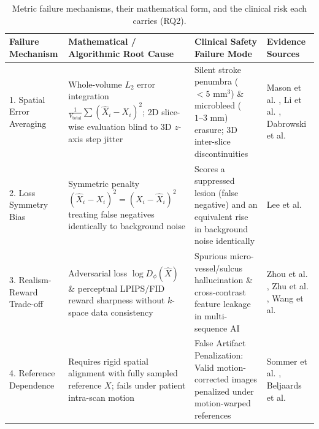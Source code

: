 \documentclass[11pt]{article}
\begin{document}
\begin{table}[t]
\centering
\caption{Metric failure mechanisms, their mathematical form, and the clinical risk each carries (RQ2).}
\label{tab:rq2_failure_modes}
\small
\setlength{\tabcolsep}{3pt}
\renewcommand{\arraystretch}{1.18}
\begin{tabular}{p{} p{} p{} p{}}
\hline
\textbf{Failure Mechanism} & \textbf{Mathematical / Algorithmic Root Cause} & \textbf{Clinical Safety Failure Mode} & \textbf{Evidence Sources} \\
\hline
1. Spatial Error Averaging & Whole-volume $L_2$ error integration $\frac{1}{V_{\text{total}}} \sum (\hat{X}_i - X_i)^2$; 2D slice-wise evaluation blind to 3D $z$-axis step jitter & Silent stroke penumbra ($<5\text{ mm}^3$) \& microbleed ($1\text{--}3\text{ mm}$) erasure; 3D inter-slice discontinuities & Mason et al. \cite{mason2020comparison}, Li et al. \cite{li2015artifactual}, Dabrowski et al. \cite{dabrowski2025sismik} \\
\hline
2. Loss Symmetry Bias & Symmetric penalty $(\hat{X}_i - X_i)^2 = (X_i - \hat{X}_i)^2$ treating false negatives identically to background noise & Scores a suppressed lesion (false negative) and an equivalent rise in background noise identically & Lee et al. \cite{junhyeok2026lesionaware} \\
\hline
3. Realism-Reward Trade-off & Adversarial loss $\log D_\phi(\hat{X})$ \& perceptual LPIPS/FID reward sharpness without $k$-space data consistency & Spurious micro-vessel/sulcus hallucination \& cross-contrast feature leakage in multi-sequence AI & Zhou et al. \cite{zhou2024adversarial}, Zhu et al. \cite{zhu2025cycleconditional}, Wang et al. \cite{wang2025variableflipangle} \\
\hline
4. Reference Dependence & Requires rigid spatial alignment with fully sampled reference $X$; fails under patient intra-scan motion & False Artifact Penalization: Valid motion-corrected images penalized under motion-warped references & Sommer et al. \cite{sommer2020correction}, Beljaards et al. \cite{beljaards2024aibased} \\
\hline
\end{tabular}
\end{table}
\end{document}
